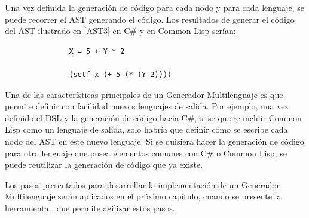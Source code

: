 Una vez definida la generación de código para cada nodo y para cada lenguaje, se puede recorrer el AST generando el código. Los resultados de generar el código del AST ilustrado en \ref{AST3} en C\# y en Common Lisp serían:
\begin{verbatim}
               X = 5 + Y * 2
               
               (setf x (+ 5 (* (Y 2))))
\end{verbatim}

Una de las características principales de un Generador Multilenguaje es que permite definir con facilidad nuevos lenguajes de salida. Por ejemplo, una vez definido el DSL y la generación de código hacia C\#, si se quiere incluir Common Lisp como un lenguaje de salida, solo habría que definir cómo se escribe cada nodo del AST en este nuevo lenguaje.  Si se quisiera hacer la generación de código para otro lenguaje que posea elementos comunes con C\# o Common Lisp, se puede reutilizar la generación de código que ya existe. 


Los pasos presentados para desarrollar la implementación de un Generador Multilenguaje serán aplicados en el próximo capítulo, cuando se presente  la herramienta \gagm, que permite agilizar estos pasos.

 



